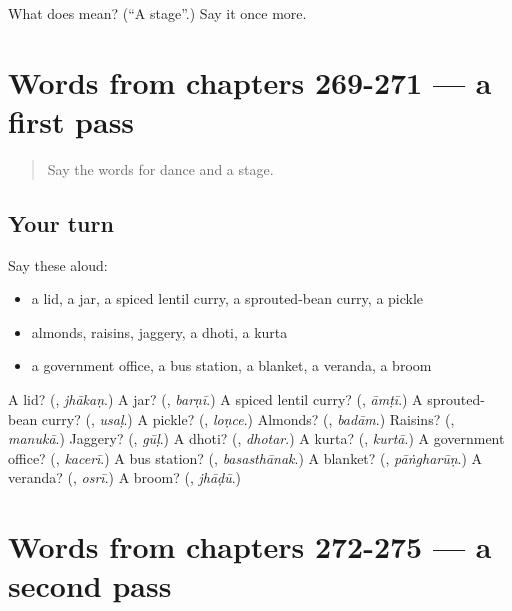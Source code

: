 \begin{tcolorbox}[breakable,colback=teal!4,colframe=teal!35!black,title={Before you move on}]
What does  mean? (\textquotedblleft{}A stage\textquotedblright{}.) Say it once more.
\end{tcolorbox}
\section[(dialogue)]{Words from chapters 269-271 — a first pass}

\label{lesson:MR-R275-first-pass-words-from-chapters-269-271}



\begin{quote}
Say the words for dance and a stage.
\end{quote}

\subsection*{Your turn}
Say these aloud:

\begin{itemize}
\raggedright
  \item a lid, a jar, a spiced lentil curry, a sprouted-bean curry, a pickle
  \item almonds, raisins, jaggery, a dhoti, a kurta
  \item a government office, a bus station, a blanket, a veranda, a broom
\end{itemize}

\begin{tcolorbox}[breakable,colback=teal!4,colframe=teal!35!black,title={Before you move on}]
A lid? (\textbf{}, \emph{jhākaṇ}.) A jar? (\textbf{}, \emph{barṇī}.) A spiced lentil curry? (\textbf{}, \emph{āmṭī}.) A sprouted-bean curry? (\textbf{}, \emph{usaḷ}.) A pickle? (\textbf{}, \emph{loṇce}.) Almonds? (\textbf{}, \emph{badām}.) Raisins? (\textbf{}, \emph{manukā}.) Jaggery? (\textbf{}, \emph{gūḷ}.) A dhoti? (\textbf{}, \emph{dhotar}.) A kurta? (\textbf{}, \emph{kurtā}.) A government office? (\textbf{}, \emph{kacerī}.) A bus station? (\textbf{}, \emph{basasthānak}.) A blanket? (\textbf{}, \emph{pāṅgharūṇ}.) A veranda? (\textbf{}, \emph{osrī}.) A broom? (\textbf{}, \emph{jhāḍū}.)
\end{tcolorbox}
\section[(dialogue)]{Words from chapters 272-275 — a second pass}

